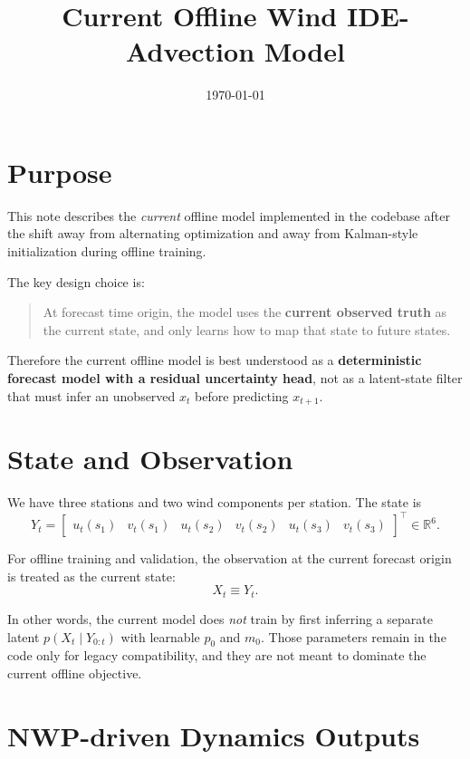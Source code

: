 \documentclass[11pt,a4paper]{article}
\title{\textbf{Current Offline Wind IDE-Advection Model}}
\author{}
\date{\today}
\newcommand{\R}{\mathbb{R}}
\begin{document}
\maketitle

\section{Purpose}

This note describes the \emph{current} offline model implemented in the codebase after the shift away from alternating optimization and away from Kalman-style initialization during offline training.

The key design choice is:
\begin{quote}
At forecast time origin, the model uses the \textbf{current observed truth} as the current state, and only learns how to map that state to future states.
\end{quote}

Therefore the current offline model is best understood as a \textbf{deterministic forecast model with a residual uncertainty head}, not as a latent-state filter that must infer an unobserved $x_t$ before predicting $x_{t+1}$.

\section{State and Observation}

We have three stations and two wind components per station. The state is
\begin{equation}
Y_t =
\begin{bmatrix}
u_t(s_1) & v_t(s_1) & u_t(s_2) & v_t(s_2) & u_t(s_3) & v_t(s_3)
\end{bmatrix}^{\!\top}
\in \R^6.
\end{equation}

For offline training and validation, the observation at the current forecast origin is treated as the current state:
\begin{equation}
X_t \equiv Y_t.
\end{equation}

In other words, the current model does \emph{not} train by first inferring a separate latent $p(X_t \mid Y_{0:t})$ with learnable $p_0$ and $m_0$. Those parameters remain in the code only for legacy compatibility, and they are not meant to dominate the current offline objective.

\section{NWP-driven Dynamics Outputs}
\end{document}
